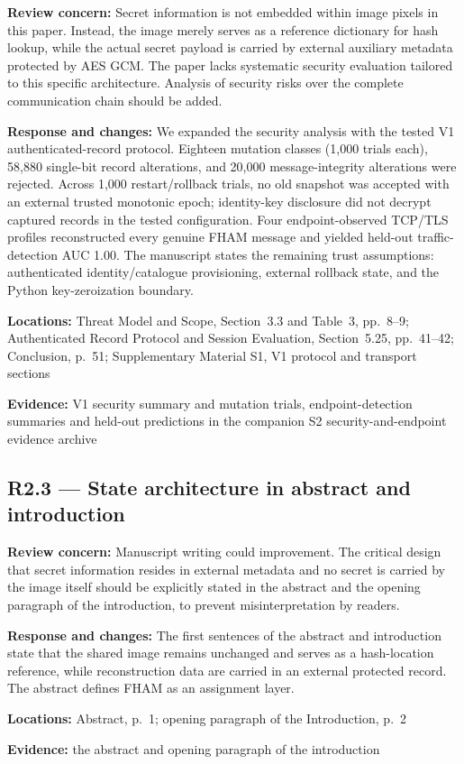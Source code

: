 \documentclass[12pt,a4paper]{article}
\newcommand{\revcomment}[1]{\par\medskip\noindent\textbf{Review concern:} #1\par\smallskip}
\newcommand{\responsechanges}[1]{\par\noindent\textbf{Response and changes:} #1\par}
\newcommand{\locations}[1]{\par\noindent\textbf{Locations:} #1\par}
\newcommand{\evidence}[1]{\par\noindent\textbf{Evidence:} #1\par\smallskip}
\begin{document}
\revcomment{Secret information is not embedded within image pixels in this paper. Instead, the image merely serves as a reference dictionary for hash lookup, while the actual secret payload is carried by external auxiliary metadata protected by AES GCM. The paper lacks systematic security evaluation tailored to this specific architecture. Analysis of security risks over the complete communication chain should be added.}
\responsechanges{We expanded the security analysis with the tested V1 authenticated-record protocol. Eighteen mutation classes (1,000 trials each), 58,880 single-bit record alterations, and 20,000 message-integrity alterations were rejected. Across 1,000 restart/rollback trials, no old snapshot was accepted with an external trusted monotonic epoch; identity-key disclosure did not decrypt captured records in the tested configuration. Four endpoint-observed TCP/TLS profiles reconstructed every genuine FHAM message and yielded held-out traffic-detection AUC 1.00. The manuscript states the remaining trust assumptions: authenticated identity/catalogue provisioning, external rollback state, and the Python key-zeroization boundary.}
\locations{Threat Model and Scope, Section~3.3 and Table~3, pp.~8--9; Authenticated Record Protocol and Session Evaluation, Section~5.25, pp.~41--42; Conclusion, p.~51; Supplementary Material S1, V1 protocol and transport sections}
\evidence{V1 security summary and mutation trials, endpoint-detection summaries and held-out predictions in the companion S2 security-and-endpoint evidence archive}

\subsection*{R2.3 --- State architecture in abstract and introduction}

\revcomment{Manuscript writing could improvement. The critical design that secret information resides in external metadata and no secret is carried by the image itself should be explicitly stated in the abstract and the opening paragraph of the introduction, to prevent misinterpretation by readers.}
\responsechanges{The first sentences of the abstract and introduction state that the shared image remains unchanged and serves as a hash-location reference, while reconstruction data are carried in an external protected record. The abstract defines FHAM as an assignment layer.}
\locations{Abstract, p.~1; opening paragraph of the Introduction, p.~2}
\evidence{the abstract and opening paragraph of the introduction}
\end{document}
